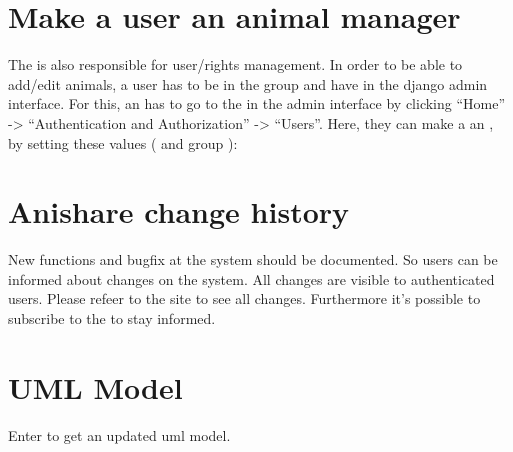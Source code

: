 \documentclass[letterpaper,10pt,openany,oneside,english]{sphinxmanual}
\begin{document}
\section{Make a user an animal manager}
\label{\detokenize{index:make-a-user-an-animal-manager}}
The  is also responsible for user/rights management.
In order to be able to add/edit animals, a user has to be in the group  and have
 in the django admin interface. For this, an  has to go to the  in the admin interface by clicking “Home” -\textgreater{} “Authentication and
Authorization” -\textgreater{} “Users”. Here, they can make a  an , by setting these values (
and group ):

\noindent{}


\section{Anishare change history}
\label{\detokenize{index:anishare-change-history}}
New functions and bugfix at the system should be documented. So users can be informed about changes on the system.
All changes are visible to authenticated users. Please refeer to the site  to see all changes. Furthermore it’s possible to subscribe to
the  to stay informed.


\section{UML Model}
\label{\detokenize{index:uml-model}}
Enter  to get an updated uml model.

\noindent{}



\renewcommand{\indexname}{Index}
\printindex
\end{document}
